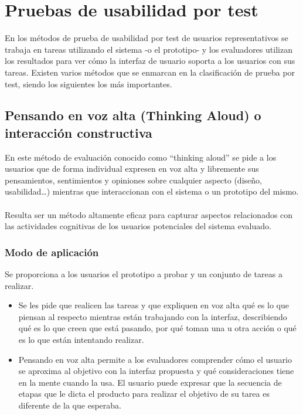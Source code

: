 \section{Pruebas de usabilidad por test}
En los métodos de prueba de usabilidad por test de usuarios representativos se trabaja en tareas utilizando el sistema -o el prototipo- y los evaluadores utilizan los resultados para ver cómo la interfaz de usuario soporta a los usuarios con sus tareas.
Existen varios métodos que se enmarcan en la clasificación de prueba por test, siendo los siguientes los más importantes.

\subsection{Pensando en voz alta (Thinking Aloud) o interacción constructiva}
En este método de evaluación conocido como “thinking aloud” se pide a los usuarios que de forma individual expresen en voz alta y libremente sus pensamientos, sentimientos y opiniones sobre cualquier aspecto (diseño, usabilidad…) mientras que interaccionan con el sistema o un prototipo del mismo. \\ \\
Resulta ser un método altamente eficaz para capturar aspectos relacionados con las actividades cognitivas de los usuarios potenciales del sistema evaluado.
\subsubsection{Modo de aplicación}
Se proporciona a los usuarios el prototipo a probar y un conjunto de tareas a realizar.
\begin{itemize}
    \item Se les pide que realicen las tareas y que expliquen en voz alta qué es lo que piensan al respecto mientras están trabajando con la interfaz, describiendo qué es lo que creen que está pasando, por qué toman una u otra acción o qué es lo que están intentando realizar. 
    \item Pensando en voz alta permite a los evaluadores comprender cómo el usuario se aproxima al objetivo con la interfaz propuesta y qué consideraciones tiene en la mente cuando la usa. El usuario puede expresar que la secuencia de etapas que le dicta el producto para realizar el objetivo de su tarea es diferente de la que esperaba.
\end{itemize}

